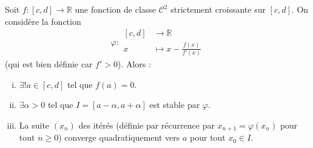 





	\begin{theorem}
		Soit $f : [c, d] \rightarrow \mathbb{R}$ une fonction de classe $\mathcal{C}^2$ strictement croissante sur $[c, d]$. On considère la fonction
		\[ \varphi :
		\begin{array}{cl}
			[c, d] &\rightarrow \mathbb{R} \\
			x &\mapsto x - \frac{f(x)}{f'(x)}
		\end{array}
		\]
		(qui est bien définie car $f' > 0$). Alors :
		\begin{enumerate}[(i)]
			\item $\exists! a \in [c, d]$ tel que $f(a) = 0$.
			\item $\exists \alpha > 0$ tel que $I = [a - \alpha, a + \alpha]$ est stable par $\varphi$.
			\item La suite $(x_n)$ des itérés (définie par récurrence par $x_{n+1} = \varphi(x_n)$ pour tout $n \geq 0$) converge quadratiquement vers $a$ pour tout $x_0 \in I$.
		\end{enumerate}
	\end{theorem}

